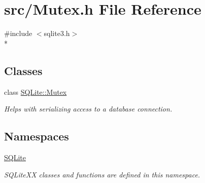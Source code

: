 \hypertarget{a00027}{\section{src/\-Mutex.h File Reference}
\label{a00027}
}
{\ttfamily \#include $<$sqlite3.\-h$>$}\\*
\subsection*{Classes}
\begin{DoxyCompactItemize}
\item 
class \hyperlink{a00009}{S\-Q\-Lite\-::\-Mutex}
\begin{DoxyCompactList}\small\item\em Helps with serializing access to a database connection. \end{DoxyCompactList}\end{DoxyCompactItemize}
\subsection*{Namespaces}
\begin{DoxyCompactItemize}
\item 
\hyperlink{a00038}{S\-Q\-Lite}
\begin{DoxyCompactList}\small\item\em S\-Q\-Lite\-X\-X classes and functions are defined in this namespace. \end{DoxyCompactList}\end{DoxyCompactItemize}

